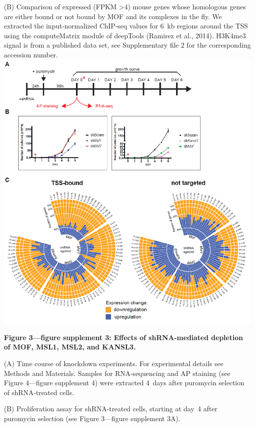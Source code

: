 \begin{footnotesize}
\begin{sffamily}
\begin{singlespacing}
(B) Comparison of expressed (FPKM \textgreater 4) mouse genes whose homologous genes are either bound or not bound by MOF and its complexes in the fly. We extracted the input-normalized ChIP-seq values for 6~kb regions around the TSS using the computeMatrix module of deepTools (Ramirez et al., 2014). H3K4me3 signal is from a published data set, see Supplementary file 2 for the corresponding accession number.
\newpage
\includegraphics[width=\textwidth]{Figures/Appendix/Figure3_supplemental_figure3_scissored.pdf}

\textbf{Figure 3—figure supplement 3: Effects of shRNA-mediated depletion of MOF, MSL1, MSL2, and KANSL3.}

(A) Time course of knockdown experiments. For experimental details see Methods and Materials. Samples for RNA-sequencing and AP staining (see Figure 4—figure supplement 4) were extracted 4~days after puromycin selection of shRNA-treated cells.

(B) Proliferation assay for shRNA-treated cells, starting at day~4 after puromycin selection (see Figure 3---figure supplement 3A).


\end{singlespacing}
\end{sffamily}
\end{footnotesize}
